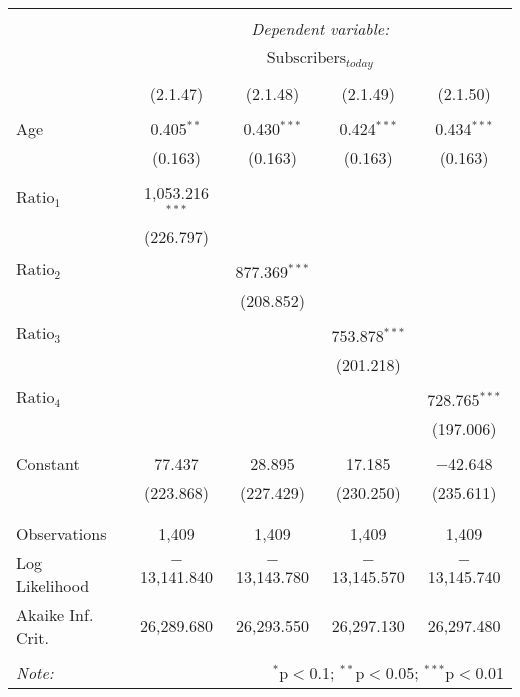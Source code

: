 
\begin{tabular}{@{\extracolsep{5pt}}lcccc}
\\[-1.8ex]\hline
\hline \\[-1.8ex]
 & \multicolumn{4}{c}{\textit{Dependent variable:}} \\
\cline{2-5}
\\[-1.8ex] & \multicolumn{4}{c}{$\text{Subscribers}_{today}$} \\
\\[-1.8ex] & (2.1.47) & (2.1.48) & (2.1.49) & (2.1.50)\\
\hline \\[-1.8ex]
 Age & 0.405$^{**}$ & 0.430$^{***}$ & 0.424$^{***}$ & 0.434$^{***}$ \\
  & (0.163) & (0.163) & (0.163) & (0.163) \\
  & & & & \\
 $\text{Ratio}_{1}$ & 1,053.216$^{***}$ &  &  &  \\
  & (226.797) &  &  &  \\
  & & & & \\
 $\text{Ratio}_{2}$ &  & 877.369$^{***}$ &  &  \\
  &  & (208.852) &  &  \\
  & & & & \\
 $\text{Ratio}_{3}$ &  &  & 753.878$^{***}$ &  \\
  &  &  & (201.218) &  \\
  & & & & \\
 $\text{Ratio}_{4}$ &  &  &  & 728.765$^{***}$ \\
  &  &  &  & (197.006) \\
  & & & & \\
 Constant & 77.437 & 28.895 & 17.185 & $-$42.648 \\
  & (223.868) & (227.429) & (230.250) & (235.611) \\
  & & & & \\
\hline \\[-1.8ex]
Observations & 1,409 & 1,409 & 1,409 & 1,409 \\
Log Likelihood & $-$13,141.840 & $-$13,143.780 & $-$13,145.570 & $-$13,145.740 \\
Akaike Inf. Crit. & 26,289.680 & 26,293.550 & 26,297.130 & 26,297.480 \\
\hline
\hline \\[-1.8ex]
\textit{Note:}  & \multicolumn{4}{r}{$^{*}$p$<$0.1; $^{**}$p$<$0.05; $^{***}$p$<$0.01} \\
\end{tabular}
